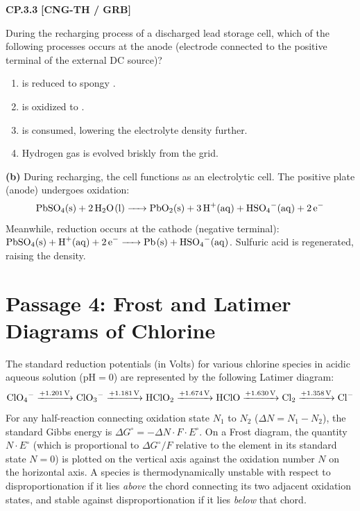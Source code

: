 \begin{problembox}
\textbf{CP.3.3} \hfill \textbf{[CNG-TH / GRB]}

During the recharging process of a discharged lead storage cell, which of the following processes occurs at the anode (electrode connected to the positive terminal of the external DC source)?
\begin{enumerate}[label=(\alph*)]
    \item {} is reduced to spongy .
    \item {} is oxidized to .
    \item {} is consumed, lowering the electrolyte density further.
    \item Hydrogen gas is evolved briskly from the  grid.
\end{enumerate}
\end{problembox}
\begin{solution}
\textbf{(b)} During recharging, the cell functions as an electrolytic cell. The positive plate (anode) undergoes oxidation:
\begin{equation*}
    \ce{PbSO4(s) + 2H2O(l) -> PbO2(s) + 3H+(aq) + HSO4^-(aq) + 2e^-}
\end{equation*}
Meanwhile, reduction occurs at the cathode (negative terminal): $\ce{PbSO4(s) + H+(aq) + 2e^- -> Pb(s) + HSO4^-(aq)}$. Sulfuric acid is regenerated, raising the density.
\end{solution}

\vspace{0.5cm}
\section*{Passage 4: Frost and Latimer Diagrams of Chlorine}

The standard reduction potentials (in Volts) for various chlorine species in acidic aqueous solution ($\text{pH} = 0$) are represented by the following Latimer diagram:
\begin{equation*}
    \ce{ClO4^-} \xrightarrow{+1.201\,\text{V}} \ce{ClO3^-} \xrightarrow{+1.181\,\text{V}} \ce{HClO2} \xrightarrow{+1.674\,\text{V}} \ce{HClO} \xrightarrow{+1.630\,\text{V}} \ce{Cl2} \xrightarrow{+1.358\,\text{V}} \ce{Cl^-}
\end{equation*}
For any half-reaction connecting oxidation state $N_1$ to $N_2$ ($\Delta N = N_1 - N_2$), the standard Gibbs energy is $\Delta G^\circ = -\Delta N \cdot F \cdot E^\circ$. On a Frost diagram, the quantity $N \cdot E^\circ$ (which is proportional to $\Delta G^\circ / F$ relative to the element in its standard state $N=0$) is plotted on the vertical axis against the oxidation number $N$ on the horizontal axis. A species is thermodynamically unstable with respect to disproportionation if it lies \textit{above} the chord connecting its two adjacent oxidation states, and stable against disproportionation if it lies \textit{below} that chord.

